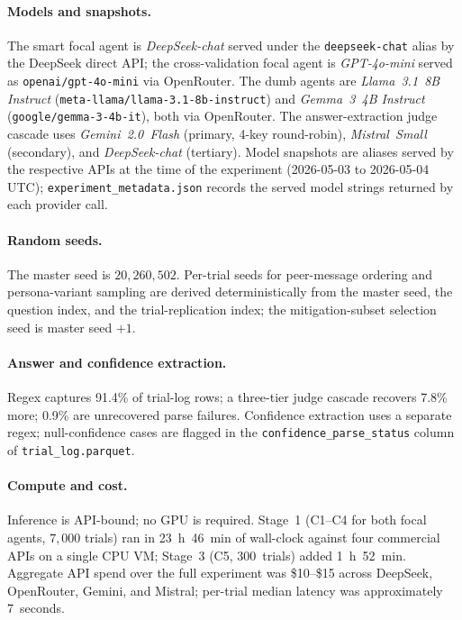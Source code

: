 \documentclass[11pt]{article}
\begin{document}
\paragraph{Models and snapshots.}
The smart focal agent is \textit{DeepSeek-chat} served under the
\texttt{deepseek-chat} alias by the DeepSeek direct API; the
cross-validation focal agent is \textit{GPT-4o-mini} served as
\texttt{openai/\allowbreak gpt-4o-mini} via OpenRouter.
The dumb agents are \textit{Llama~3.1~8B Instruct}
(\texttt{meta-llama/\allowbreak llama-3.1-8b-instruct}) and
\textit{Gemma~3~4B Instruct}
(\texttt{google/\allowbreak gemma-3-4b-it}), both via OpenRouter.
The answer-extraction judge cascade uses \textit{Gemini~2.0~Flash}
(primary, 4-key round-robin), \textit{Mistral~Small} (secondary),
and \textit{DeepSeek-chat} (tertiary).
Model snapshots are aliases served by the respective APIs at the
time of the experiment (2026-05-03 to 2026-05-04 UTC);
\texttt{experiment\_metadata.json} records the served model strings
returned by each provider call.

\paragraph{Random seeds.}
The master seed is $20{,}260{,}502$.
Per-trial seeds for peer-message ordering and persona-variant sampling
are derived deterministically from the master seed, the question
index, and the trial-replication index; the mitigation-subset
selection seed is master seed $+1$.

\paragraph{Answer and confidence extraction.}
Regex captures 91.4\% of trial-log rows; a three-tier judge cascade
recovers 7.8\% more; 0.9\% are unrecovered parse failures.
Confidence extraction uses a separate regex; null-confidence cases are
flagged in the \texttt{confidence\_parse\_status} column of
\texttt{trial\_log.parquet}.

\paragraph{Compute and cost.}
Inference is API-bound; no GPU is required.
Stage~1 (C1--C4 for both focal agents, $7{,}000$ trials) ran in
23~h~46~min of wall-clock against four commercial APIs on a single
CPU VM; Stage~3 (C5, 300~trials) added 1~h~52~min.
Aggregate API spend over the full experiment was \$10--\$15 across
DeepSeek, OpenRouter, Gemini, and Mistral; per-trial median latency
was approximately 7~seconds.
\end{document}
